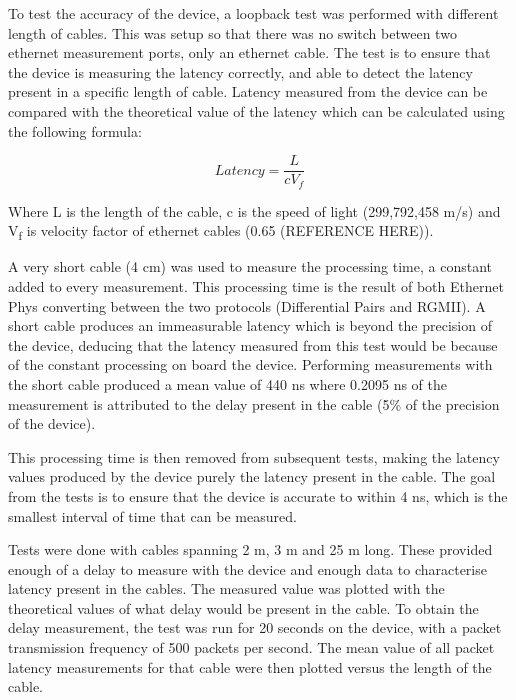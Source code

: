 To test the accuracy of the device, a loopback test was performed with different length of cables. This was setup so 
that there was no switch between two ethernet measurement ports, only an ethernet cable. The test is to ensure that 
the device is measuring the latency correctly, and able to detect the latency present in a specific length of cable. 
Latency measured from the device can be compared with the theoretical value of the latency which can be calculated 
using the following formula:

\[ Latency = \frac{L}{cV_f} \] 

Where L is the length of the cable, c is the speed of light (299,792,458 m/s) and V\textsubscript{f} is velocity 
factor of ethernet cables (0.65 (REFERENCE HERE)).

A very short cable (4 cm) was used to measure the processing time, a constant added to every measurement. This 
processing time is the result of both Ethernet Phys converting between the two protocols (Differential Pairs and 
RGMII). A short cable produces an immeasurable latency which is beyond the precision of the device, deducing that 
the latency measured from this test would be because of the constant processing on board the device. Performing 
measurements with the short cable produced a mean value of 440 ns where 0.2095 ns of the measurement is attributed 
to the delay present in the cable (5\% of the precision of the device). 

This processing time is then removed from subsequent tests, making the latency values produced by the device purely 
the latency present in the cable. The goal from the tests is to ensure that the device is accurate to within 4 ns, 
which is the smallest interval of time that can be measured. 

Tests were done with cables spanning 2 m, 3 m and 25 m long. These provided enough of a delay to measure with the 
device and enough data to characterise latency present in the cables. The measured value was plotted with the 
theoretical values of what delay would be present in the cable. To obtain the delay measurement, the test was run 
for 20 seconds on the device, with a packet transmission frequency of 500 packets per second. The mean value of all 
packet latency measurements for that cable were then plotted versus the length of the cable.

